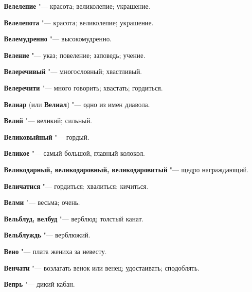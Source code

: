 \begin{mymulticols}{2}
\noindent\textbf{Велелепие} "--- красота; великолепие; украшение. 




\noindent\textbf{Велелепота} "--- красота; великолепие; украшение. 




\noindent\textbf{Велемудренно} "--- высокомудренно. 




\noindent\textbf{Веление} "--- указ; повеление; заповедь; учение. 




\noindent\textbf{Велеречивый} "--- многословный; хвастливый. 




\noindent\textbf{Велеречити} "--- много говорить; хвастать; гордиться. 




\noindent\textbf{Велиар} (или \textbf{Велиал}) "--- одно из имен диавола. 




\noindent\textbf{Велий} "--- великий; сильный. 




\noindent\textbf{Великовыйный} "--- гордый. 




\noindent\textbf{Великое} "--- самый большой, главный колокол. 




\noindent\textbf{Великодарный, великодаровный, великодаровитый} "--- щедро награждающий. 




\noindent\textbf{Величатися} "--- гордиться; хвалиться; кичиться. 




\noindent\textbf{Велми} "--- весьма; очень. 




\noindent\textbf{Вельблуд, велбуд} "--- верблюд; толстый канат. 




\noindent\textbf{Вельблуждь} "--- верблюжий. 




\noindent\textbf{Вено} "--- плата жениха за невесту. 




\noindent\textbf{Венчати} "--- возлагать венок или венец; удостаивать; сподоблять. 




\noindent\textbf{Вепрь} "--- дикий кабан. 





\end{mymulticols}
